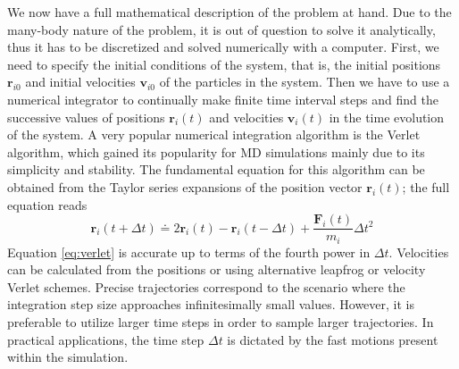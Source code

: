 We now have a full mathematical description of the problem at hand. Due to the
many-body nature of the problem, it is out of question to solve it
analytically, thus it has to be discretized and solved numerically with a
computer. First, we need to specify the initial conditions of the system,
that is, the initial positions $\mathbf{r}_{i0}$ and initial velocities
$\mathbf{v}_{i0}$ of the particles in the system. Then we have to use a
numerical integrator to continually make finite time interval steps and find
the successive values of positions $\mathbf{r}_i(t)$ and velocities
$\mathbf{v}_{i}(t)$ in the time evolution of the system. A very popular
numerical integration algorithm is the Verlet algorithm, which gained its
popularity for MD simulations mainly due to its simplicity and stability.
The fundamental equation for this algorithm can be obtained from the Taylor
series expansions of the position vector $\mathbf{r}_i(t)$; the full equation
reads
\begin{equation}
  \mathbf{r}_i (t + \Delta t) \doteq 2 \mathbf{r}_i(t)
    - \mathbf{r}_i(t - \Delta t) + \frac{\mathbf{F}_i(t)}{m_i} \Delta t^2
  \label{eq:verlet}
\end{equation}
Equation \eqref{eq:verlet} is accurate up to terms of the fourth power in
$\Delta t$. Velocities can be calculated from the positions or using
alternative leapfrog or velocity Verlet schemes. Precise trajectories
correspond to the scenario where the integration step size approaches
infinitesimally small values. However, it is preferable to utilize larger time
steps in order to sample larger trajectories. In practical applications, the
time step $\Delta t$ is dictated by the fast motions present within the
simulation.

